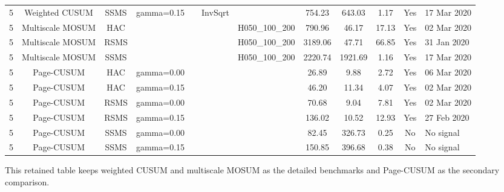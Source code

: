 \begin{table}[htbp]
\begin{tabular}{cccccccccccl}
5 & Weighted CUSUM & SSMS & gamma=0.15 &  & InvSqrt &  & 754.23 & 643.03 & 1.17 & Yes & 17 Mar 2020 \\
5 & Multiscale MOSUM & HAC &  &  &  & H050_100_200 & 790.96 & 46.17 & 17.13 & Yes & 02 Mar 2020 \\
5 & Multiscale MOSUM & RSMS &  &  &  & H050_100_200 & 3189.06 & 47.71 & 66.85 & Yes & 31 Jan 2020 \\
5 & Multiscale MOSUM & SSMS &  &  &  & H050_100_200 & 2220.74 & 1921.69 & 1.16 & Yes & 17 Mar 2020 \\
5 & Page-CUSUM & HAC & gamma=0.00 &  &  &  & 26.89 & 9.88 & 2.72 & Yes & 06 Mar 2020 \\
5 & Page-CUSUM & HAC & gamma=0.15 &  &  &  & 46.20 & 11.34 & 4.07 & Yes & 02 Mar 2020 \\
5 & Page-CUSUM & RSMS & gamma=0.00 &  &  &  & 70.68 & 9.04 & 7.81 & Yes & 02 Mar 2020 \\
5 & Page-CUSUM & RSMS & gamma=0.15 &  &  &  & 136.02 & 10.52 & 12.93 & Yes & 27 Feb 2020 \\
5 & Page-CUSUM & SSMS & gamma=0.00 &  &  &  & 82.45 & 326.73 & 0.25 & No & No signal \\
5 & Page-CUSUM & SSMS & gamma=0.15 &  &  &  & 150.85 & 396.68 & 0.38 & No & No signal \\
\bottomrule
\end{tabular}
\begin{flushleft}
\footnotesize
This retained table keeps weighted CUSUM and multiscale MOSUM as the detailed benchmarks and Page-CUSUM as the secondary comparison.
\end{flushleft}
\end{table}
